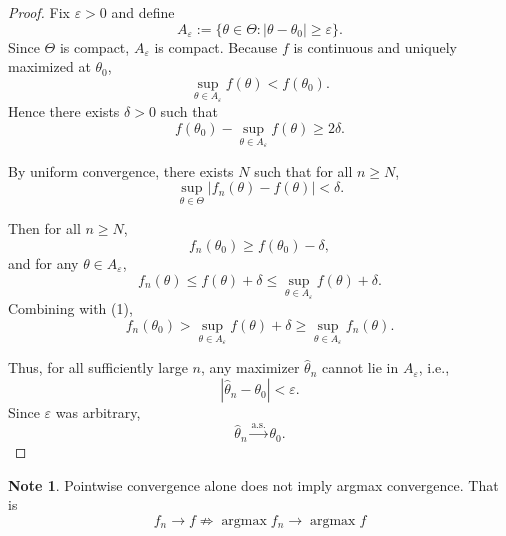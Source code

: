 \documentclass[11pt]{article}
\theoremstyle{definition}
\newtheorem{note}{Note}[section]
\begin{document}
\begin{proof}
Fix $\varepsilon > 0$ and define
\[
A_\varepsilon := \{ \theta \in \Theta : |\theta - \theta_0| \ge \varepsilon \}.
\]
Since $\Theta$ is compact, $A_\varepsilon$ is compact.
Because $f$ is continuous and uniquely maximized at $\theta_0$,
\[
\sup_{\theta \in A_\varepsilon} f(\theta) < f(\theta_0).
\]
Hence there exists $\delta > 0$ such that
\[
f(\theta_0) - \sup_{\theta \in A_\varepsilon} f(\theta) \ge 2\delta.
\tag{1}
\]

By uniform convergence, there exists $N$ such that for all $n \ge N$,
\[
\sup_{\theta \in \Theta} |f_n(\theta) - f(\theta)| < \delta.
\tag{2}
\]

Then for all $n \ge N$,
\[
f_n(\theta_0) \ge f(\theta_0) - \delta,
\]
and for any $\theta \in A_\varepsilon$,
\[
f_n(\theta) \le f(\theta) + \delta \le \sup_{\theta \in A_\varepsilon} f(\theta) + \delta.
\]
Combining with (1),
\[
f_n(\theta_0)
> \sup_{\theta \in A_\varepsilon} f(\theta) + \delta
\ge \sup_{\theta \in A_\varepsilon} f_n(\theta).
\]

Thus, for all sufficiently large $n$, any maximizer $\hat{\theta}_n$ cannot lie in $A_\varepsilon$, i.e.,
\[
|\hat{\theta}_n - \theta_0| < \varepsilon.
\]
Since $\varepsilon$ was arbitrary,
\[
\hat{\theta}_n \xrightarrow{\text{a.s.}} \theta_0.
\]
\end{proof}
\begin{note}
    Pointwise convergence alone does not imply argmax convergence. That is
    $$
    f_n\rightarrow f \nRightarrow \operatorname{argmax}f_n\rightarrow\operatorname{argmax}f
    $$
\end{note}
\end{document}
